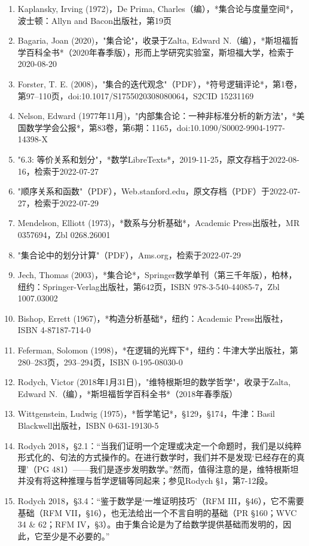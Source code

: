 \begin{enumerate}
\item Kaplansky, Irving (1972)，De Prima, Charles（编），*集合论与度量空间*，波士顿：Allyn and Bacon出版社，第19页
\item Bagaria, Joan (2020)，"集合论"，收录于Zalta, Edward N.（编），*斯坦福哲学百科全书*（2020年春季版），形而上学研究实验室，斯坦福大学，检索于2020-08-20  
\item Forster, T. E. (2008)，"集合的迭代观念"（PDF），*符号逻辑评论*，第1卷，第97–110页，doi:10.1017/S1755020308080064，S2CID 15231169  
\item Nelson, Edward (1977年11月)，"内部集合论：一种非标准分析的新方法"，*美国数学学会公报*，第83卷，第6期：1165，doi:10.1090/S0002-9904-1977-14398-X
\item "6.3: 等价关系和划分"，*数学LibreTexts*，2019-11-25，原文存档于2022-08-16，检索于2022-07-27  
\item "顺序关系和函数"（PDF），Web.stanford.edu，原文存档（PDF）于2022-07-27，检索于2022-07-29  
\item Mendelson, Elliott (1973)，*数系与分析基础*，Academic Press出版社，MR 0357694，Zbl 0268.26001
\item "集合论中的划分计算"（PDF），Ams.org，检索于2022-07-29  
\item Jech, Thomas (2003)，*集合论*，Springer数学单刊（第三千年版），柏林，纽约：Springer-Verlag出版社，第642页，ISBN 978-3-540-44085-7，Zbl 1007.03002  
\item Bishop, Errett (1967)，*构造分析基础*，纽约：Academic Press出版社，ISBN 4-87187-714-0  
\item Feferman, Solomon (1998)，*在逻辑的光辉下*，纽约：牛津大学出版社，第280–283页，293–294页，ISBN 0-195-08030-0  
\item Rodych, Victor (2018年1月31日)，"维特根斯坦的数学哲学"，收录于Zalta, Edward N.（编），*斯坦福哲学百科全书*（2018年春季版）
\item Wittgenstein, Ludwig (1975)，*哲学笔记*，§129，§174，牛津：Basil Blackwell出版社，ISBN 0-631-19130-5  
\item Rodych 2018，§2.1：“当我们证明一个定理或决定一个命题时，我们是以纯粹形式化的、句法的方式操作的。在进行数学时，我们并不是发现‘已经存在的真理’（PG 481）——我们是逐步发明数学。”然而，值得注意的是，维特根斯坦并没有将这种推理与哲学逻辑等同起来；参见Rodych §1，第7-12段。  
\item Rodych 2018，§3.4：“鉴于数学是‘一堆证明技巧’（RFM III，§46），它不需要基础（RFM VII，§16），也无法给出一个不言自明的基础（PR §160；WVC 34 & 62；RFM IV，§3）。由于集合论是为了给数学提供基础而发明的，因此，它至少是不必要的。”

\end{enumerate}
